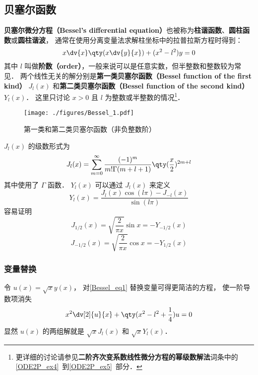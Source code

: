 

\subsection{贝塞尔函数}
\textbf{贝塞尔微分方程（Bessel's differential equation）}也被称为\textbf{柱谐函数}、\textbf{圆柱函数}或\textbf{圆柱谐波}， 通常在使用分离变量法求解柱坐标中的拉普拉斯方程时得到：
\begin{equation}\label{Bessel_eq1}
x\dv{x}\qty(x\dv{y}{x}) + (x^2 - l ^2)y = 0
\end{equation}
其中 $l$ 叫做\textbf{阶数（order）}，一般来说可以是任意实数，但半整数和整数较为常见． 两个线性无关的解分别是\textbf{第一类贝塞尔函数（Bessel function of the first kind）} $J_l(x)$ 和\textbf{第二类贝塞尔函数（Bessel function of the second kind）} $Y_l(x)$． 这里只讨论 $x > 0$ 且 $l$ 为整数或半整数的情况\footnote{更详细的讨论请参见\textbf{二阶齐次变系数线性微分方程的幂级数解法}词条中的\autoref{ODE2P_ex4}~到\autoref{ODE2P_ex5}~部分．}．

\begin{figure}[ht]
\centering
\texttt{[image: ./figures/Bessel\_1.pdf]}
\caption{第一类和第二类贝塞尔函数（非负整数阶）} \label{Bessel_fig1}
\end{figure}

$J_l(x)$ 的级数形式为
\begin{equation}\label{Bessel_eq3}
J_l(x) = \sum_{m=0}^\infty \frac{(-1)^m}{m!\Gamma(m+l+1)} \qty(\frac x2)^{2m+l}
\end{equation}
其中使用了 $\Gamma$ 函数． $Y_l(x)$ 可以通过 $J_l(x)$ 来定义
\begin{equation}
Y_l(x) = \frac{J_l(x)\cos(l\pi) - J_{-l}(x)}{\sin(l\pi)}
\end{equation}
容易证明
\begin{equation}
J_{1/2}(x) = \sqrt{\frac{2}{\pi x}} \sin x = -Y_{-1/2}(x)
\end{equation}
\begin{equation}
J_{-1/2}(x) = \sqrt{\frac{2}{\pi x}} \cos x = -Y_{1/2}(x)
\end{equation}

\subsubsection{变量替换}
令 $u(x) = \sqrt{x} y(x)$， 对\autoref{Bessel_eq1} 替换变量可得更简洁的方程， 使一阶导数项消失
\begin{equation}
x^2\dv[2]{u}{x} + \qty(x^2 - l^2 + \frac{1}{4}) u = 0
\end{equation}
显然 $u(x)$ 的两组解就是 $\sqrt{x}J_l(x)$ 和 $\sqrt{x}Y_l(x)$．

